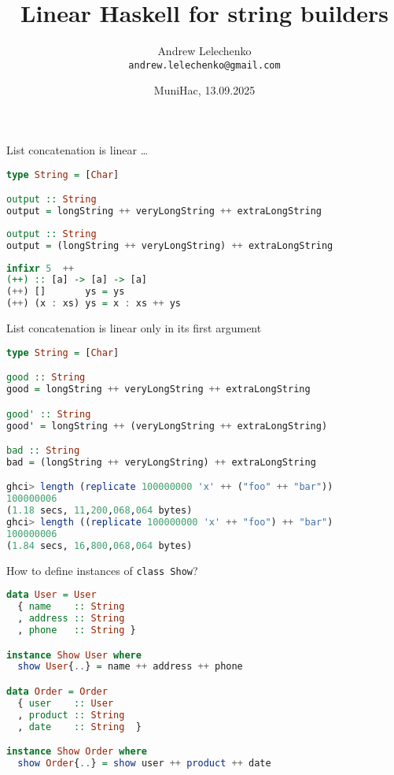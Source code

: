 \documentclass[handout]{beamer}
\title{Linear Haskell for string builders}
\author[Andrew Lelechenko]{Andrew Lelechenko \\ \texttt{andrew.lelechenko@gmail.com}}
\date{MuniHac, 13.09.2025}
\begin{document}
\begin{frame}
  \titlepage

\end{frame}

\begin{frame}[fragile]{List concatenation is linear \dots}

\begin{lstlisting}[language=Haskell]
type String = [Char]

output :: String
output = longString ++ veryLongString ++ extraLongString
\end{lstlisting}

\begin{lstlisting}[language=Haskell]
output :: String
output = (longString ++ veryLongString) ++ extraLongString
\end{lstlisting}

\begin{lstlisting}[language=Haskell]
infixr 5  ++
(++) :: [a] -> [a] -> [a]
(++) []       ys = ys
(++) (x : xs) ys = x : xs ++ ys
\end{lstlisting}

\end{frame}

\begin{frame}[fragile]{List concatenation is linear only in its first argument}

\begin{lstlisting}[language=Haskell]
type String = [Char]

good :: String
good = longString ++ veryLongString ++ extraLongString

good' :: String
good' = longString ++ (veryLongString ++ extraLongString)

bad :: String
bad = (longString ++ veryLongString) ++ extraLongString

ghci> length (replicate 100000000 'x' ++ ("foo" ++ "bar"))
100000006
(1.18 secs, 11,200,068,064 bytes)
ghci> length ((replicate 100000000 'x' ++ "foo") ++ "bar")
100000006
(1.84 secs, 16,800,068,064 bytes)
\end{lstlisting}

\end{frame}

\begin{frame}[fragile]{How to define instances of {\tt class Show}?}

\begin{lstlisting}[language=Haskell]
data User = User
  { name    :: String
  , address :: String
  , phone   :: String }

instance Show User where
  show User{..} = name ++ address ++ phone

data Order = Order
  { user    :: User
  , product :: String
  , date    :: String  }

instance Show Order where
  show Order{..} = show user ++ product ++ date
\end{lstlisting}

\end{frame}
\end{document}

